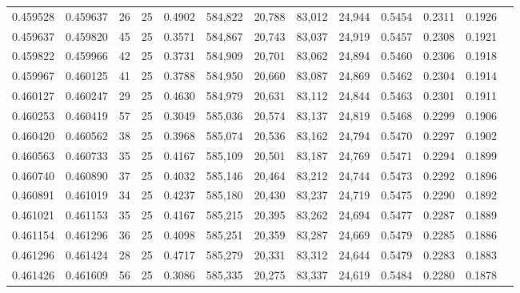 \begin{tabular}{rrrrrrrrrrrrr}
0.459528 & 0.459637 &    26 &  25 &                                     0.4902 & 584,822 &  20,788 &  83,012 &  24,944 & 0.5454 & 0.2311 & 0.1926 \\
0.459637 & 0.459820 &    45 &  25 &                                     0.3571 & 584,867 &  20,743 &  83,037 &  24,919 & 0.5457 & 0.2308 & 0.1921 \\
0.459822 & 0.459966 &    42 &  25 &                                     0.3731 & 584,909 &  20,701 &  83,062 &  24,894 & 0.5460 & 0.2306 & 0.1918 \\
0.459967 & 0.460125 &    41 &  25 &                                     0.3788 & 584,950 &  20,660 &  83,087 &  24,869 & 0.5462 & 0.2304 & 0.1914 \\
0.460127 & 0.460247 &    29 &  25 &                                     0.4630 & 584,979 &  20,631 &  83,112 &  24,844 & 0.5463 & 0.2301 & 0.1911 \\
0.460253 & 0.460419 &    57 &  25 &                                     0.3049 & 585,036 &  20,574 &  83,137 &  24,819 & 0.5468 & 0.2299 & 0.1906 \\
0.460420 & 0.460562 &    38 &  25 &                                     0.3968 & 585,074 &  20,536 &  83,162 &  24,794 & 0.5470 & 0.2297 & 0.1902 \\
0.460563 & 0.460733 &    35 &  25 &                                     0.4167 & 585,109 &  20,501 &  83,187 &  24,769 & 0.5471 & 0.2294 & 0.1899 \\
0.460740 & 0.460890 &    37 &  25 &                                     0.4032 & 585,146 &  20,464 &  83,212 &  24,744 & 0.5473 & 0.2292 & 0.1896 \\
0.460891 & 0.461019 &    34 &  25 &                                     0.4237 & 585,180 &  20,430 &  83,237 &  24,719 & 0.5475 & 0.2290 & 0.1892 \\
0.461021 & 0.461153 &    35 &  25 &                                     0.4167 & 585,215 &  20,395 &  83,262 &  24,694 & 0.5477 & 0.2287 & 0.1889 \\
0.461154 & 0.461296 &    36 &  25 &                                     0.4098 & 585,251 &  20,359 &  83,287 &  24,669 & 0.5479 & 0.2285 & 0.1886 \\
0.461296 & 0.461424 &    28 &  25 &                                     0.4717 & 585,279 &  20,331 &  83,312 &  24,644 & 0.5479 & 0.2283 & 0.1883 \\
0.461426 & 0.461609 &    56 &  25 &                                     0.3086 & 585,335 &  20,275 &  83,337 &  24,619 & 0.5484 & 0.2280 & 0.1878 \\

\end{tabular}

